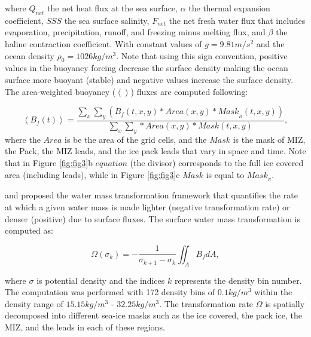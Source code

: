\documentclass[lineno,sn-basic]{sn-jnl}%
\begin{document}
where $Q_{net}$ the net heat flux at the sea surface, $\alpha$ the thermal expansion coefficient, $SSS$ the sea surface salinity, $F_{net}$ the net fresh water flux that includes evaporation, precipitation, runoff, and freezing minus melting flux, and $\beta$ the haline contraction coefficient. With constant values of $g = 9.81 m/s^2$ and the ocean density $\rho_0 = 1026 kg/m^3$. 
Note that using this sign convention, positive values in the buoyancy forcing decrease the surface density making the ocean surface more buoyant (stable) and negative values increase the surface density. The area-weighted buoyancy ($ \left<\right>$) fluxes are computed following:

\begin{equation}
    \left<B_f (t)\right>  = \frac{\sum_x \sum_y \left( B_f(t,x,y) * Area(x,y) * Mask_{_R}(t,x,y)\right)}{\sum_x \sum_y * Area(x,y) * Mask(t,x,y)},
\end{equation}
where the $Area$ is be the area of the grid cells, and the $Mask$ is the mask of MIZ, the Pack, the MIZ leads, and the ice pack leads that vary in space and time. Note that in Figure \ref{fig:fig3}b ${equation}$ (the divisor) corresponds to the full ice covered area (including leads), while in Figure \ref{fig:fig3}c $Mask$ is equal to $Mask_{_R}$.

\citet{Nurser_WMT_1999} and  \citet{Walin_WMT_1982} proposed the water mass transformation framework that quantifies the rate at which a given water mass is made lighter (negative transformation rate) or denser (positive) due to surface fluxes. The surface water mass transformation is computed as:

\begin{equation}
    \Omega(\sigma_k) = - \frac{1}{\sigma_{k+1}-\sigma_k}\iint_AB_fdA,
\end{equation}


where $\sigma$ is potential density and the indices $k$ represents the density bin number. The computation was performed with 172 density bins of $0.1 kg/m^3$ within the density range of $15.15 kg/m^3$ - $32.25 kg/m^3$. The transformation rate $\Omega$ is spatially decomposed into different sea-ice masks such as the ice covered, the pack ice, the MIZ, and the leads in each of these regions. 
\end{document}
